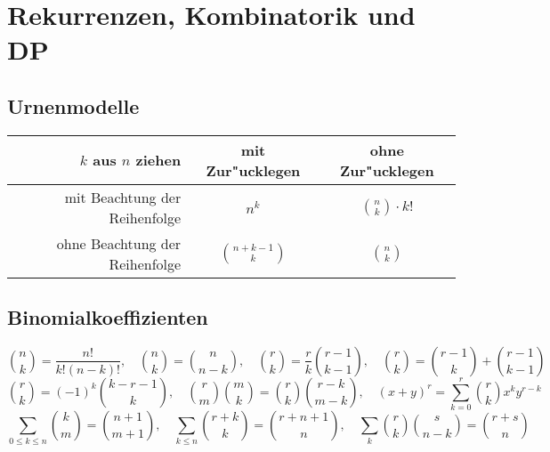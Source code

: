 \section{Rekurrenzen, Kombinatorik und DP}



\subsection{Urnenmodelle}

\begin{tabular}{r||c|c}
\(k\) aus \(n\) ziehen & mit Zur"ucklegen & ohne Zur"ucklegen \\
\hline
mit Beachtung der Reihenfolge & \(n^k\) & \(\binom{n}{k}\cdot k!\) \\
\hline
ohne Beachtung der Reihenfolge & \(\binom{n+k-1}{k}\) & \(\binom{n}{k}\) \\
\end{tabular}

\subsection{Binomialkoeffizienten}

\[ \binom{n}{k} = \frac{n!}{k!(n-k)!}, \quad
\binom{n}{k} = \binom{n}{n-k}, \quad
\binom{r}{k} = \frac{r}{k} \binom{r-1}{k-1}, \quad
\binom{r}{k} = \binom{r-1}{k} + \binom{r-1}{k-1} \]
\[ \binom{r}{k} = (-1)^k \binom{k-r-1}{k}, \quad
\binom{r}{m} \binom{m}{k} = \binom{r}{k} \binom{r-k}{m-k}, \quad
(x+y)^r = \sum_{k=0}^r \binom{r}{k} x^k y^{r - k} \]
\[ \sum_{0 \leq k \leq n} \binom{k}{m} = \binom{n+1}{m+1}, \quad
\sum_{k \leq n} \binom{r+k}{k} = \binom{r+n+1}{n}, \quad
\sum_k \binom{r}{k} \binom{s}{n-k} = \binom{r+s}{n} \]

